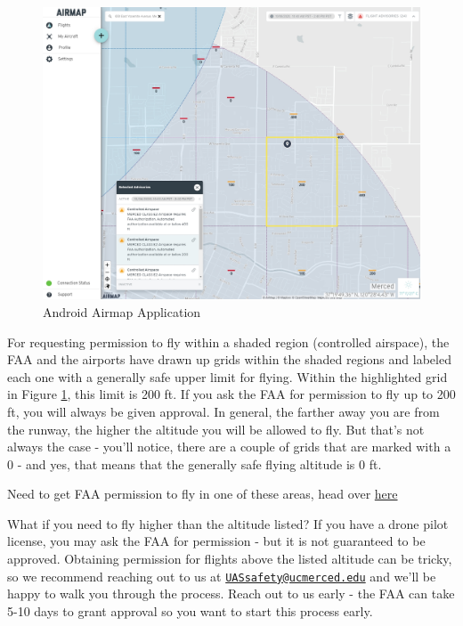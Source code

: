 \documentclass[
  12pt,
]{book}
\newenvironment{notebox}{
  \definecolor{shadecolor}{gray}{.8}  %
  \color{black}
  \begin{shaded}}
 {\end{shaded}}
\begin{document}
\begin{figure}

{\centering \includegraphics[width=0.85\linewidth]{images/Airmap-webpage} 

}

\caption{Android Airmap Application}\label{fig:airmap-web}
\end{figure}

For requesting permission to fly within a shaded region (controlled airspace), the FAA and the airports have drawn up grids within the shaded regions and labeled each one with a generally safe upper limit for flying. Within the highlighted grid in Figure \ref{fig:airmap-web}, this limit is 200 ft. If you ask the FAA for permission to fly up to 200 ft, you will always be given approval. In general, the farther away you are from the runway, the higher the altitude you will be allowed to fly. But that's not always the case - you'll notice, there are a couple of grids that are marked with a 0 - and yes, that means that the generally safe flying altitude is 0 ft.

\begin{notebox}
Need to get FAA permission to fly in one of these areas, head over \hyperref[LAANC]{here}

\end{notebox}

What if you need to fly higher than the altitude listed? If you have a drone pilot license, you may ask the FAA for permission - but it is not guaranteed to be approved. Obtaining permission for flights above the listed altitude can be tricky, so we recommend reaching out to us at \href{mailto:UASsafety@ucmerced.edu}{\nolinkurl{UASsafety@ucmerced.edu}} and we'll be happy to walk you through the process. Reach out to us early - the FAA can take 5-10 days to grant approval so you want to start this process early.
\end{document}
